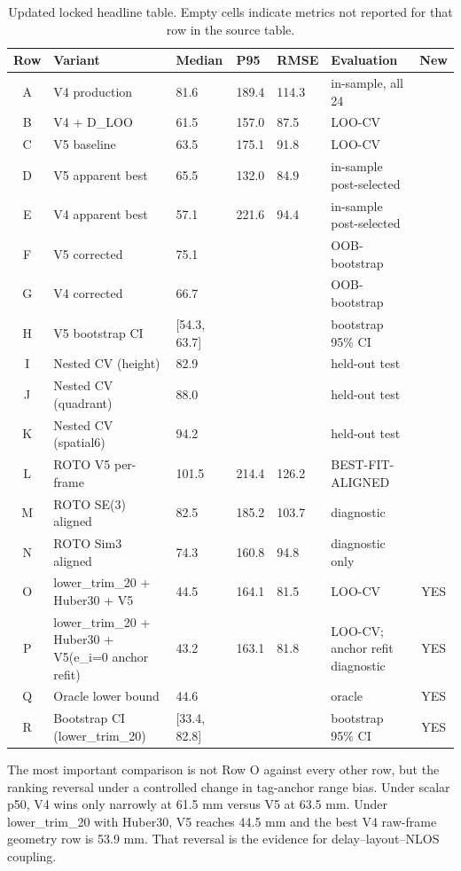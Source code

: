 \documentclass[11pt,a4paper]{article}
\begin{document}
\begin{table}[H]
\centering
\caption{Updated locked headline table. Empty cells indicate metrics not reported for that row in the source table.}
\label{tab:headline}
\scriptsize
\begin{tabular}{@{}cp{38mm}p{17mm}p{15mm}p{15mm}p{38mm}c@{}}
\toprule
Row & Variant & Median & P95 & RMSE & Evaluation & New \\
\midrule
A & V4 production & 81.6 & 189.4 & 114.3 & in-sample, all 24 &  \\
B & V4 + D\_LOO & 61.5 & 157.0 & 87.5 & LOO-CV &  \\
C & V5 baseline & 63.5 & 175.1 & 91.8 & LOO-CV &  \\
D & V5 apparent best & 65.5 & 132.0 & 84.9 & in-sample post-selected &  \\
E & V4 apparent best & 57.1 & 221.6 & 94.4 & in-sample post-selected &  \\
F & V5 corrected & 75.1 &  &  & OOB-bootstrap &  \\
G & V4 corrected & 66.7 &  &  & OOB-bootstrap &  \\
H & V5 bootstrap CI & [54.3, 63.7] &  &  & bootstrap 95\% CI &  \\
I & Nested CV (height) & 82.9 &  &  & held-out test &  \\
J & Nested CV (quadrant) & 88.0 &  &  & held-out test &  \\
K & Nested CV (spatial6) & 94.2 &  &  & held-out test &  \\
L & ROTO V5 per-frame & 101.5 & 214.4 & 126.2 & BEST-FIT-ALIGNED &  \\
M & ROTO SE(3) aligned & 82.5 & 185.2 & 103.7 & diagnostic &  \\
N & ROTO Sim3 aligned & 74.3 & 160.8 & 94.8 & diagnostic only &  \\
O & lower\_trim\_20 + Huber30 + V5 & 44.5 & 164.1 & 81.5 & LOO-CV & YES \\
P & lower\_trim\_20 + Huber30 + V5(e\_i=0 anchor refit) & 43.2 & 163.1 & 81.8 & LOO-CV; anchor refit diagnostic & YES \\
Q & Oracle lower bound & 44.6 &  &  & oracle & YES \\
R & Bootstrap CI (lower\_trim\_20) & [33.4, 82.8] &  &  & bootstrap 95\% CI & YES \\
\bottomrule
\end{tabular}
\end{table}

The most important comparison is not Row O against every other row, but the ranking reversal under a controlled change in tag-anchor range bias. Under scalar p50, V4 wins only narrowly at 61.5 mm versus V5 at 63.5 mm. Under lower\_trim\_20 with Huber30, V5 reaches 44.5 mm and the best V4 raw-frame geometry row is 53.9 mm. That reversal is the evidence for delay--layout--NLOS coupling.
\end{document}
